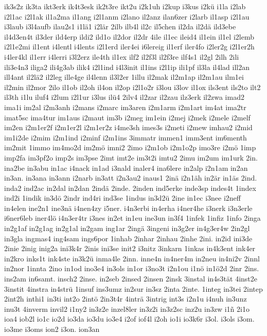 {ik3s2z
ik3ta
ikt3erk
ik4t3esk
ik2t3re
ikt2u
i2k1uh
i2kup
i3kus
i2kü
i1la
i2lab
i2l1ac
i2l1ak
il1a2ma
il1ang
i2l1anm
i2lano
il2anz
ilan6zer
i2larb
il1asp
i2l1au
i3laub
i3l4aufb
ilau2s1
i1lä1
i2lär
2ilb
ilb4l
il2c
il5chen
il2da
il2dä
ild3ebe
il4d3en4t
il3der
ild4erp
ildi2
ild1o
il2dor
il2dr
4ile
il1ec
ileid4
il1ein
il1el
i2lemb
i2l1e2mi
il1ent
i4lentl
i4lents
i2l1erd
iler4ei
i6lereig
il1erf
iler4fo
i2ler2g
i2l1er2h
i4ler4kl
il1err
i4lerri
i3l2erz
ile4th
il1ex
ilf2
il2f3l
il2f3re
ilf4s1
il2gl
2ilh
2ili
ili3e4n3
iliga2
ili4g3ab
ilik4
i2l1ind
i4l3init
il1ins
i2l1ip
ili1pf
il3la
il4lad
ill2an
ill4ant
il2lä2
il2leg
ille4ge
il4lenn
il3l2er
1illu
il2mak
il2m1ap
il2m1au
ilm1ei
il2min
il2mor
2ilo
il1ob
il2oh
il4on
il2op
i2l1o2r
i3lou
i3lov
il1ox
ils3ent
ils2to
ilt2
il3th
i1lu
iluf4
i2lum
i2l1ur
i3lus
ilü4
2ilv4
il2zar
il2zau
ilz3erk
il2zwa
imad2
ima1i
im2al
i2m3anh
i2mans
i2marc
im3aren
i2m1arm
i2m1art
im4at
ima2tr
imat5sc
ima4tur
im1aus
i2maut
im3b
i2meg
im1ein
i2mej
i2mek
i2mele
i2melf
im2en
i2m1er2f
i2m1er2l
i2m1er2z
i4me3sh
imes3s
i2meti
i2mew
imhau2
i2mid
im1i2de
i2mim
i2m1ind
i2minf
i2m1ins
3immatr
immen1
imm3ent
im6menth
im2mit
1immo
im4mo2d
im2mö
imni2
2imo
i2m1ob
i2m1o2p
imo3re
i2mö
1imp
imp2fa
im3pf2o
imp2s
im3pse
2imt
imt2e
im3t2i
imtu2
2imu
im2um
im1urk
2in.
ina2be
in3abu
in1ac
i4nack
in1ad
i3nald
inaler4
ina6lere
in2alp
i2n1am
in2an
in3an.
in3ana
in3ann
i2narb
in3att
i2n3au2
inaus1
2inä
i2n1äh
in2är
in1äs
2ind.
inda2
ind2ac
in2dal
in2dan
2indä
2inde.
2inden
ind5erke
inde3sp
indes4t
1index
ind2i
1indik
in3dö
2indr
ind4ri
ind3se
1indus
in3d2ü
2ine
in1ec
i3nee
i2neff
in4elen
ine2n1
ine3nä
i4nen4zy
i5ner.
i4n3erbi
in4erha
i4ner4he
i3nerk
i3n3erle
i6ner6leb
iner4lö
i4n3er4tr
i3nes
in2et
in1eu
ine3un
in3f4
1infek
1infiz
1info
2inga
in2g1af
in2g1ag
in2g1al
in2gam
ing1ar
2ingä
3ingeni
in3g2er
in4g3er4w
2in2gl
in3gla
ingmas4
ing4sam
ings6por
1inhab
2inhar
2inhau
2inhe
2ini.
in2id
ini3de
2inie
2inig
inig2a
ini3k4r
2inis
ini3se
init2
i3nitz
3inkarn
1inkas
in4k3ent
ink4er
in2kro
inks1t
ink4ste
in3k2ü
inma4le
2inn.
inne4n
in4ner4m
in2neu
in4ni2v
2innl
in2nor
1innta
2ino
in1od
ino3e4
in3ols
in1or
i3no3t
i2n1ou
i1nö
in1ö2d
2inr
2ins.
ins2am
in6samt.
insch2
2inse.
in2seb
2insed
2insen
2insk
3instal
in4s3tät
4inst2e
3instit
4instra
in4strü
1insuf
ins3umz
in2sur
in3sz
2inta
2inte.
1integ
in3tei
2intep
2int2h
inthi1
in3ti
int2o
2intö
2in3t4r
4inträ
3intrig
int3s
i2n1u
i4nuh
in3unz
inu3t
4inverm
invil2
i1ny2
in3z2e
inzel8ler
in3z2i
in3z2sc
inz2u
in3zw
i1ñ
2i1o
ioa4
iob2l
io1c
io2d
io3da
io3du
io3e4
i2of
iof4l
i2oh
io1i
io3k6r
i3ol.
i3ols
i3om.
io3me
i3oms
ion2
i3on.
ion3an
}
